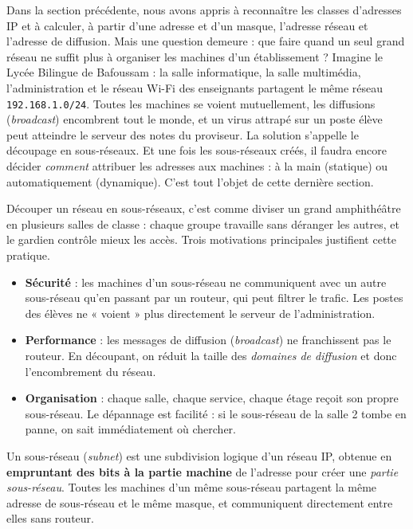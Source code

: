 \documentclass[11pt]{article}
\newcommand{\cle}[1]{{\popxbold\color{popdark}#1}}
\newcounter{popsec}
\newcounter{popsub}
\newcommand{\courssub}[1]{%
  \stepcounter{popsub}%
  \par\vspace{9pt}\noindent{\popxbold\fontsize{11.5}{13}\selectfont\color{popink}{\color{poporange}\thepopsec.\thepopsub}\hspace{6pt}#1}\par\nopagebreak\vspace{4pt}
}
\begin{document}
Dans la section précédente, nous avons appris à reconnaître les classes d'adresses IP et à calculer, à partir d'une adresse et d'un masque, l'adresse réseau et l'adresse de diffusion. Mais une question demeure : que faire quand un seul grand réseau ne suffit plus à organiser les machines d'un établissement ? Imagine le Lycée Bilingue de Bafoussam : la salle informatique, la salle multimédia, l'administration et le réseau Wi-Fi des enseignants partagent le même réseau \texttt{192.168.1.0/24}. Toutes les machines se voient mutuellement, les diffusions (\emph{broadcast}) encombrent tout le monde, et un virus attrapé sur un poste élève peut atteindre le serveur des notes du proviseur. La solution s'appelle le \cle{découpage en sous-réseaux}. Et une fois les sous-réseaux créés, il faudra encore décider \emph{comment} attribuer les adresses aux machines : à la main (statique) ou automatiquement (dynamique). C'est tout l'objet de cette dernière section.

\courssub{Pourquoi découper un réseau ?}

Découper un réseau en sous-réseaux, c'est comme diviser un grand amphithéâtre en plusieurs salles de classe : chaque groupe travaille sans déranger les autres, et le gardien contrôle mieux les accès. Trois motivations principales justifient cette pratique.

\begin{itemize}
\item \textbf{Sécurité} : les machines d'un sous-réseau ne communiquent avec un autre sous-réseau qu'en passant par un \cle{routeur}, qui peut filtrer le trafic. Les postes des élèves ne « voient » plus directement le serveur de l'administration.
\item \textbf{Performance} : les messages de diffusion (\emph{broadcast}) ne franchissent pas le routeur. En découpant, on réduit la taille des \emph{domaines de diffusion} et donc l'encombrement du réseau.
\item \textbf{Organisation} : chaque salle, chaque service, chaque étage reçoit son propre sous-réseau. Le dépannage est facilité : si le sous-réseau de la salle 2 tombe en panne, on sait immédiatement où chercher.
\end{itemize}

\begin{definition}
Un \cle{sous-réseau} (\emph{subnet}) est une subdivision logique d'un réseau IP, obtenue en \textbf{empruntant des bits à la partie machine} de l'adresse pour créer une \emph{partie sous-réseau}. Toutes les machines d'un même sous-réseau partagent la même adresse de sous-réseau et le même masque, et communiquent directement entre elles sans routeur.
\end{definition}
\end{document}

